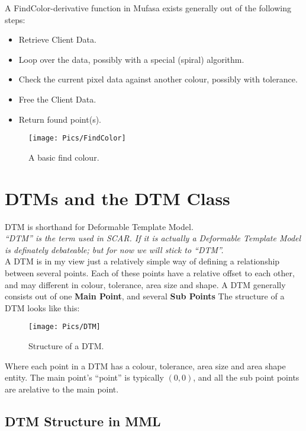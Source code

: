 \documentclass[a4paper, 10pt]{report} %
\begin{document}
A FindColor-derivative function in Mufasa exists generally out of the following
steps:
\begin{itemize}
	\item Retrieve Client Data.
	\item Loop over the data, possibly with a special (spiral) algorithm.
	\item Check the current pixel data against another colour, possibly 
		  with tolerance.
	\item Free the Client Data.
	\item Return found point(s).
\end{itemize}

\begin{figure}[ht]
    \texttt{[image: Pics/FindColor]}
    \caption{A basic find colour.}
\end{figure}

\section{DTMs and the DTM Class}

DTM is shorthand for Deformable Template Model. \\

\emph{``DTM'' is the term used in SCAR. If it is actually a Deformable Template
Model is definately debateable; but for now we will stick to ``DTM''.} \\

A DTM is in my view just a relatively simple way of defining a relationship
between several points. Each of these points have a relative offset to each
other, and may different in colour, tolerance, area size and shape.
A DTM generally consists out of one \textbf{Main Point}, and several
\textbf{Sub Points}
The structure of a DTM looks like this:

\begin{figure}[ht]
    \texttt{[image: Pics/DTM]}
    \caption{Structure of a DTM.}
\end{figure}

Where each point in a DTM has a colour, tolerance, area size and area shape
entity. The main point's ``point'' is typically $ (0, 0) $, and all the
sub point points are arelative to the main point.

\subsection{DTM Structure in MML}
\end{document}
